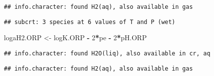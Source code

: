 \documentclass[]{article}
\newenvironment{Shaded}{\begin{snugshade}}{\end{snugshade}}
\newcommand{\KeywordTok}[1]{\textcolor[rgb]{0.13,0.29,0.53}{\textbf{#1}}}
\newcommand{\DataTypeTok}[1]{\textcolor[rgb]{0.13,0.29,0.53}{#1}}
\newcommand{\DecValTok}[1]{\textcolor[rgb]{0.00,0.00,0.81}{#1}}
\newcommand{\FloatTok}[1]{\textcolor[rgb]{0.00,0.00,0.81}{#1}}
\newcommand{\StringTok}[1]{\textcolor[rgb]{0.31,0.60,0.02}{#1}}
\newcommand{\OperatorTok}[1]{\textcolor[rgb]{0.81,0.36,0.00}{\textbf{#1}}}
\newcommand{\NormalTok}[1]{#1}
\begin{document}
\begin{verbatim}
## info.character: found H2(aq), also available in gas
\end{verbatim}

\begin{verbatim}
## subcrt: 3 species at 6 values of T and P (wet)
\end{verbatim}

\begin{Shaded}
\begin{Highlighting}[]
\NormalTok{logaH2.ORP <-}\StringTok{ }\NormalTok{logK.ORP }\OperatorTok{-}\StringTok{ }\DecValTok{2}\OperatorTok{*}\NormalTok{pe }\OperatorTok{-}\StringTok{ }\DecValTok{2}\OperatorTok{*}\NormalTok{pH.ORP}
\end{Highlighting}
\end{Shaded}

\begin{Shaded}
\end{Shaded}

\begin{verbatim}
## info.character: found H2O(liq), also available in cr, aq
\end{verbatim}

\begin{verbatim}
## info.character: found H2(aq), also available in gas
\end{verbatim}
\end{document}
